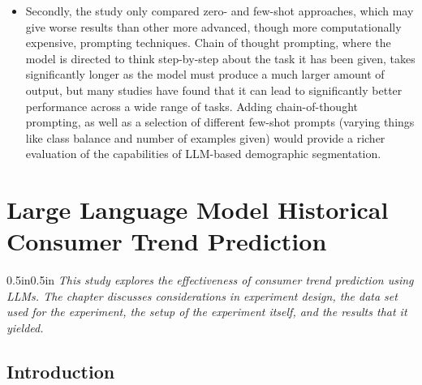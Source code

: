 \documentclass{report}
\begin{document}
\begin{itemize}
\item Secondly, the study only compared zero- and few-shot approaches, which may give worse results than other more advanced, though more computationally expensive, prompting techniques. Chain of thought prompting, where the model is directed to think step-by-step about the task it has been given, takes significantly longer as the model must produce a much larger amount of output, but many studies have found that it can lead to significantly better performance across a wide range of tasks. Adding chain-of-thought prompting, as well as a selection of different few-shot prompts (varying things like class balance and number of examples given) would provide a richer evaluation of the capabilities of LLM-based demographic segmentation.
\end{itemize}

\chapter{Large Language Model Historical Consumer Trend Prediction}

\begin{adjustwidth}{0.5in}{0.5in}
\textit{This study explores the effectiveness of consumer trend prediction using LLMs. The chapter discusses considerations in experiment design, the data set used for the experiment, the setup of the experiment itself, and the results that it yielded.}
\end{adjustwidth}

\section{Introduction}
\end{document}

